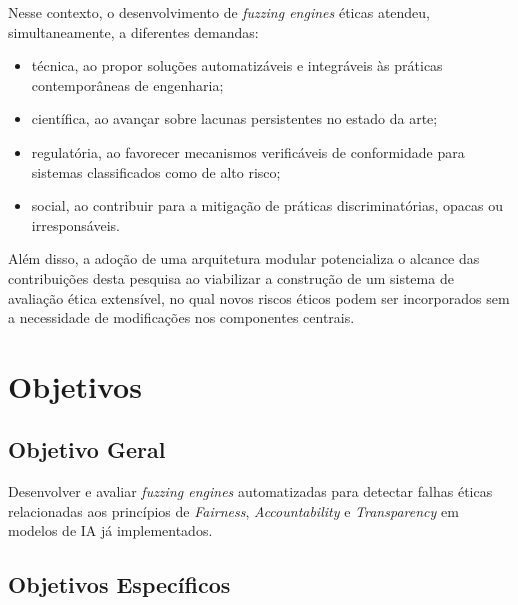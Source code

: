Nesse contexto, o desenvolvimento de \textit{fuzzing engines} éticas atendeu, simultaneamente, a diferentes demandas:

\begin{itemize}
    \item técnica, ao propor soluções automatizáveis e integráveis às práticas contemporâneas de engenharia;
    \item científica, ao avançar sobre lacunas persistentes no estado da arte;
    \item regulatória, ao favorecer mecanismos verificáveis de conformidade para sistemas classificados como de alto risco;
    \item social, ao contribuir para a mitigação de práticas discriminatórias, opacas ou irresponsáveis.
\end{itemize}

Além disso, a adoção de uma arquitetura modular potencializa o alcance das contribuições desta pesquisa ao viabilizar a construção de um sistema de avaliação ética extensível, no qual novos riscos éticos podem ser incorporados sem a necessidade de modificações nos componentes centrais.

\section{Objetivos}

\subsection{Objetivo Geral}

Desenvolver e avaliar \textit{fuzzing engines} automatizadas para detectar falhas éticas relacionadas aos princípios de \textit{Fairness}, \textit{Accountability} e \textit{Transparency} em modelos de IA já implementados.

\subsection{Objetivos Específicos}

